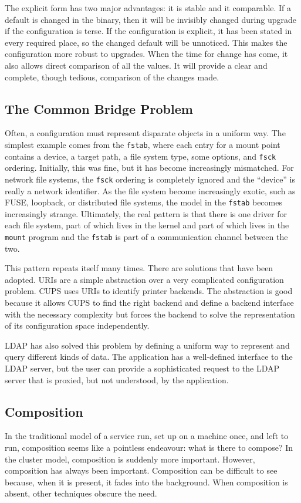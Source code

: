\documentclass[letterpaper,twocolumn,10pt]{article}
\begin{document}
The explicit form has two major advantages: it is stable and it comparable. If a default is changed in the binary, then it will be invisibly changed during upgrade if the configuration is terse. If the configuration is explicit, it has been stated in every required place, so the changed default will be unnoticed. This makes the configuration more robust to upgrades. When the time for change has come, it also allows direct comparison of all the values. It will provide a clear and complete, though tedious, comparison of the changes made.

\subsection{The Common Bridge Problem}
Often, a configuration must represent disparate objects in a uniform way. The simplest example comes from the \texttt{fstab}, where each entry for a mount point contains a device, a target path, a file system type, some options, and \texttt{fsck} ordering. Initially, this was fine, but it has become increasingly mismatched. For network file systems, the \texttt{fsck} ordering is completely ignored and the ``device'' is really a network identifier. As the file system become increasingly exotic, such as FUSE, loopback, or distributed file systems, the model in the \texttt{fstab} becomes increasingly strange. Ultimately, the real pattern is that there is one driver for each file system, part of which lives in the kernel and part of which lives in the \texttt{mount} program and the \texttt{fstab} is part of a communication channel between the two.

This pattern repeats itself many times. There are solutions that have been adopted. URIs are a simple abstraction over a very complicated configuration problem. CUPS uses URIs to identify printer backends. The abstraction is good because it allows CUPS to find the right backend and define a backend interface with the necessary complexity but forces the backend to solve the representation of its configuration space independently.

LDAP has also solved this problem by defining a uniform way to represent and query different kinds of data. The application has a well-defined interface to the LDAP server, but the user can provide a sophisticated request to the LDAP server that is proxied, but not understood, by the application.

\subsection{Composition}
In the traditional model of a service run, set up on a machine once, and left to run, composition seems like a pointless endeavour: what is there to compose? In the cluster model, composition is suddenly more important. However, composition has always been important. Composition can be difficult to see because, when it is present, it fades into the background. When composition is absent, other techniques obscure the need.
\end{document}
